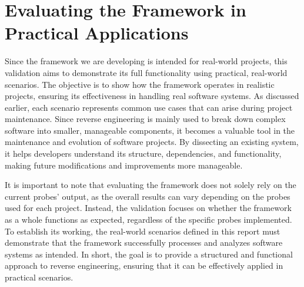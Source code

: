 \section{Evaluating the Framework in Practical Applications}

Since the framework we are developing is intended for real-world projects, this validation aims to demonstrate its full functionality using practical, real-world scenarios. The objective is to show how the framework operates in realistic projects, ensuring its effectiveness in handling real software systems. As discussed earlier, each scenario represents common use cases that can arise during project maintenance. Since reverse engineering is mainly used to break down complex software into smaller, manageable components, it becomes a valuable tool in the maintenance and evolution of software projects. By dissecting an existing system, it helps developers understand its structure, dependencies, and functionality, making future modifications and improvements more manageable.

It is important to note that evaluating the framework does not solely rely on the current probes' output, as the overall results can vary depending on the probes used for each project. Instead, the validation focuses on whether the framework as a whole functions as expected, regardless of the specific probes implemented. To establish its working, the real-world scenarios defined in this report must demonstrate that the framework successfully processes and analyzes software systems as intended. In short, the goal is to provide a structured and functional approach to reverse engineering, ensuring that it can be effectively applied in practical scenarios.